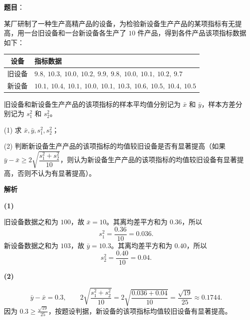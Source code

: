 \begin{answer}

\textbf{题目}：

某厂研制了一种生产高精产品的设备，为检验新设备生产产品的某项指标有无提高，用一台旧设备和一台新设备各生产了 $10$ 件产品，得到各件产品该项指标数据如下：

\begin{center}
\begin{tabular}{cl}
\toprule
设备 & 指标数据 \\
\midrule
旧设备 & $9.8,\ 10.3,\ 10.0,\ 10.2,\ 9.9,\ 9.8,\ 10.0,\ 10.1,\ 10.2,\ 9.7$ \\
新设备 & $10.1,\ 10.4,\ 10.1,\ 10.0,\ 10.1,\ 10.3,\ 10.6,\ 10.5,\ 10.4,\ 10.5$ \\
\bottomrule
\end{tabular}
\end{center}

旧设备和新设备生产产品的该项指标的样本平均值分别记为 $\bar x$ 和 $\bar y$，样本方差分别记为 $s_1^2$ 和 $s_2^2$。

(1) 求 $\bar x,\bar y,s_1^2,s_2^2$；

(2) 判断新设备生产产品的该项指标的均值较旧设备是否有显著提高（如果 $\bar y-\bar x\geqslant2\sqrt{\dfrac{s_1^2+s_2^2}{10}}$，则认为新设备生产产品的该项指标的均值较旧设备有显著提高，否则不认为有显著提高）。

\textbf{解析}

\textbf{(1)}

旧设备数据之和为 $100$，故 $\bar x=10$。其离均差平方和为 $0.36$，所以
\nopagebreak[4]
\[
s_1^2=\frac{0.36}{10}=0.036.
\]
新设备数据之和为 $103$，故 $\bar y=10.3$。其离均差平方和为 $0.40$，所以
\nopagebreak[4]
\[
s_2^2=\frac{0.40}{10}=0.04.
\]

\textbf{(2)}

\nopagebreak[4]
\[
\bar y-\bar x=0.3,\qquad
2\sqrt{\frac{s_1^2+s_2^2}{10}}
=2\sqrt{\frac{0.036+0.04}{10}}
=\frac{\sqrt{19}}{25}\approx0.1744.
\]
因为 $0.3\geqslant\frac{\sqrt{19}}{25}$，按题设判据，新设备的该项指标均值较旧设备有显著提高。



\end{answer}
